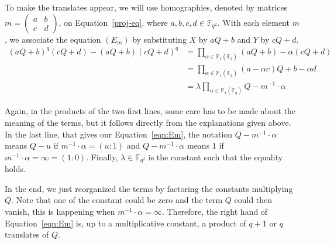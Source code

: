 \documentclass[a4paper,11pt]{article}
\theoremstyle{break}
\theoremstyle{sc}
\theoremstyle{definition}
\theoremstyle{remark}
\begin{document}
To make the translates appear, we will use homographies, denoted by
matrices $m=\begin{pmatrix} a&b\\c&d\end{pmatrix}$, on
Equation~\eqref{proj-eq}, where $a, b, c, d\in\mathbb{F}_{q^2}$. With each element $m$, we associate the equation
$(E_m)$ by substituting $X$ by $aQ+b$ and $Y$ by $cQ+d$.
\begin{align}
  (aQ+b)^q(cQ+d)-(aQ+b)(cQ+d)^q &=
  \prod_{\alpha\in\mathbb{P}_1(\mathbb{F}_q)}(aQ+b)-\alpha(cQ+d)\nonumber\\
  &= \prod_{\alpha\in\mathbb{P}_1(\mathbb{F}_q)}(a-\alpha c)Q+b-\alpha
  d\nonumber\\
  \label{eqn:Em}
  \tag{$E_m$}
  &=
  \lambda\prod_{\alpha\in\mathbb{P}_1(\mathbb{F}_q)}Q-m^{-1}\cdot\alpha
\end{align}

Again, in the products of the two first lines, some care has to be made about
the meaning of the terms, but it follows directly from the explanations given
above. In the last line, that gives our Equation~\eqref{eqn:Em}, the notation
$Q-m^{-1}\cdot\alpha$ means $Q-u$ if $m^{-1}\cdot\alpha=(u:1)$ and
$Q-m^{-1}\cdot\alpha$ means $1$ if $m^{-1}\cdot\alpha=\infty=(1:0)$.
Finally, $\lambda\in\mathbb{F}_{q^2}$ is the constant such that the equality
holds.

In the end, we just reorganized the terms by factoring the constants multiplying $Q$.
Note that one of the constant could be zero and the term $Q$ could then vanish,
this is happening when $m^{-1}\cdot\alpha=\infty$. Therefore, the right hand of
Equation~\eqref{eqn:Em} is, up to a multiplicative constant, a product of $q+1$ or $q$
translates of $Q$.
\end{document}
